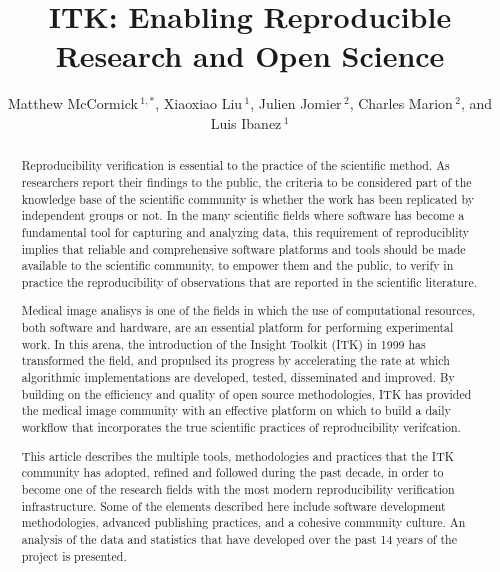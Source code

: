 \documentclass{frontiersENG} %
\def\firstAuthorLast{McCormick {et~al.}} %
\def\Authors{Matthew McCormick\,$^{1,*}$,
  Xiaoxiao Liu\,$^{1}$,
  Julien Jomier\,$^{2}$,
  Charles Marion\,$^{2}$,
  and Luis Ibanez\,$^1$}
\begin{document}
\onecolumn
{}

\title[ITK Reproducible Research]{ITK: Enabling Reproducible Research and Open Science}
\author[\firstAuthorLast ]{\Authors}
\address{}
\correspondance{}
\extraAuth{}%

\maketitle
\begin{abstract}

Reproducibility verification is essential to the practice of the scientific
method. As researchers report their findings to the public, the criteria
to be considered part of the knowledge base of the scientific
community is whether the work has been replicated by independent groups or not. In
the many scientific fields where software has become a fundamental tool for
capturing and analyzing data, this requirement of reproduciblity implies that
reliable and comprehensive software platforms and tools should be made
available to the scientific community, to empower them and the public, to verify
in practice the reproducibility of observations that are reported in the
scientific literature.

Medical image analisys is one of the fields in which the use of computational
resources, both software and hardware, are an essential platform for performing
experimental work. In this arena, the introduction of the Insight Toolkit (ITK)
in 1999 has transformed the field, and propulsed its progress by accelerating
the rate at which algorithmic implementations are developed, tested,
disseminated and improved. By building on the efficiency and quality of open
source methodologies, ITK has provided the medical image community with an
effective platform on which to build a daily workflow that incorporates the
true scientific practices of reproducibility verifcation.

This article describes the multiple tools, methodologies and practices that the
ITK community has adopted, refined and followed during the past decade, in
order to become one of the research fields with the most modern reproducibility
verification infrastructure. Some of the elements described here include
software development methodologies, advanced publishing practices, and a
cohesive community culture. An analysis of the data and statistics that have
developed over the past 14 years of the project is presented.


\end{abstract}
\end{document}
